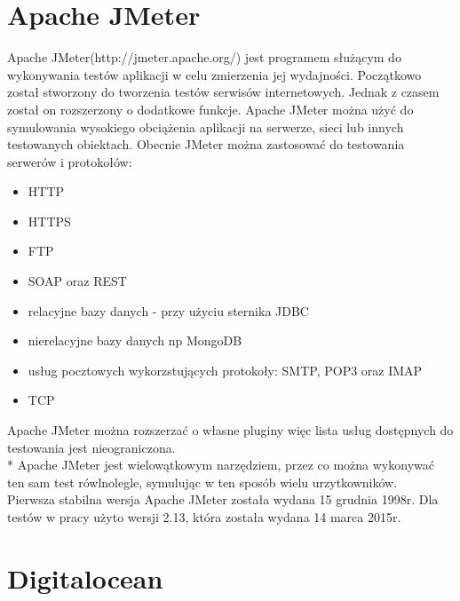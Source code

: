\section{Apache JMeter}
Apache JMeter(http://jmeter.apache.org/) jest programem służącym do wykonywania testów aplikacji w celu zmierzenia jej wydajności.  Początkowo został stworzony do tworzenia testów serwisów internetowych. Jednak z czasem został on rozszerzony o dodatkowe funkcje. Apache JMeter można użyć do symulowania wysokiego obciążenia aplikacji na serwerze, sieci lub innych testowanych obiektach.
Obecnie JMeter można zastosować do testowania serwerów i protokołów:
\begin{itemize}
\item HTTP
\item HTTPS
\item FTP
\item SOAP oraz REST
\item relacyjne bazy danych - przy użyciu sternika JDBC
\item nierelacyjne bazy danych np MongoDB
\item usług pocztowych wykorzstujących protokoły: SMTP, POP3 oraz IMAP
\item TCP
\end{itemize}
Apache JMeter można rozszerzać o własne pluginy więc lista usług dostępnych do testowania jest nieograniczona. \\*
Apache JMeter jest wielowątkowym narzędziem, przez co można wykonywać ten sam test rówlnolegle, symulując w ten sposób wielu urzytkowników. \\
Pierwsza stabilna wersja Apache JMeter została wydana 15 grudnia 1998r. Dla testów w pracy użyto wersji 2.13, która została wydana 14 marca 2015r.

\section{Digitalocean}

